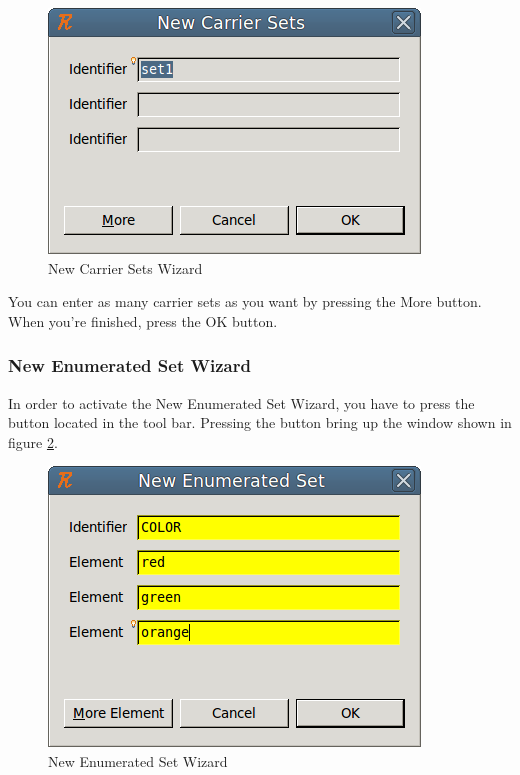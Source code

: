 \begin{figure}[!h]
\begin{center}
	\includegraphics{img/reference/ref_01_eventb_editor4.png}
	\caption{New Carrier Sets Wizard}
	\label{fig_ref_01_eventb_editor4}
\end{center}
\end{figure}

You can enter as many carrier sets as you want by pressing the \textsf{More} button. When you’re finished, press the \textsf{OK} button. 

\subsubsection{New Enumerated Set Wizard}

In order to activate the \textsf{New Enumerated Set Wizard}, you have to press the  button located in the tool bar. Pressing the button bring up the window shown in figure \ref{fig_ref_01_eventb_editor5}.

\begin{figure}[!h]
\begin{center}
	\includegraphics{img/reference/ref_01_eventb_editor5.png}
	\caption{New Enumerated Set Wizard}
	\label{fig_ref_01_eventb_editor5}
\end{center}
\end{figure}

